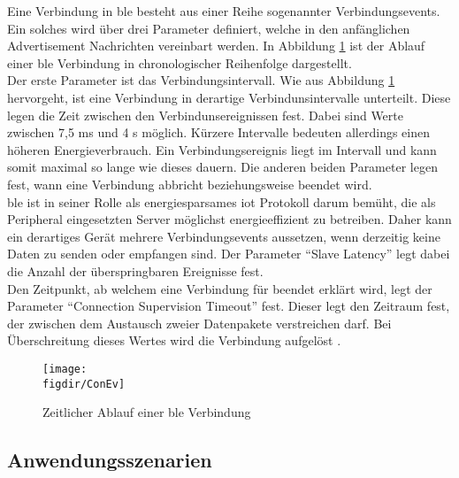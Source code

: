 \noindent Eine Verbindung in \ac{ble} besteht aus einer Reihe sogenannter Verbindungsevents. Ein solches wird über drei Parameter definiert, welche in den anfänglichen Advertisement Nachrichten vereinbart werden. In Abbildung \ref{FIG:ConEv} ist der Ablauf einer \ac{ble} Verbindung in chronologischer Reihenfolge dargestellt.\\
\noindent Der erste Parameter ist das Verbindungsintervall. Wie aus Abbildung \ref{FIG:ConEv} hervorgeht, ist eine Verbindung in derartige Verbindunsintervalle unterteilt. Diese legen die Zeit zwischen den Verbindunsereignissen fest. Dabei sind Werte zwischen 7,5 ms und 4 s möglich. Kürzere Intervalle bedeuten allerdings einen höheren Energieverbrauch. Ein Verbindungsereignis liegt im Intervall und kann somit maximal so lange wie dieses dauern. Die anderen beiden Parameter legen fest, wann eine Verbindung abbricht beziehungsweise beendet wird.\\ 
\noindent \ac{ble} ist in seiner Rolle als energiesparsames \ac{iot} Protokoll darum bemüht, die als Peripheral eingesetzten Server möglichst energieeffizient zu betreiben. Daher kann ein derartiges Gerät mehrere Verbindungsevents aussetzen, wenn derzeitig keine Daten zu senden oder empfangen sind. Der Parameter "`Slave Latency"' legt dabei die Anzahl der überspringbaren Ereignisse fest.\\
\noindent Den Zeitpunkt, ab welchem eine Verbindung für beendet erklärt wird, legt der Parameter "`Connection Supervision Timeout"' fest. Dieser legt den Zeitraum fest, der zwischen dem Austausch zweier Datenpakete verstreichen darf. Bei Überschreitung dieses Wertes wird die Verbindung aufgelöst \cite[Seite 22f]{Townsend14:GSB}.\\

\begin{figure}[!h]
	\centering
	\texttt{[image: \\figdir/ConEv]}
	\caption{Zeitlicher Ablauf einer \ac{ble} Verbindung \cite[Seite 22]{Townsend14:GSB}}
	\label{FIG:ConEv}
\end{figure}

\subsection{Anwendungsszenarien}
\label{ss:funktionsweise:anwendungen}

